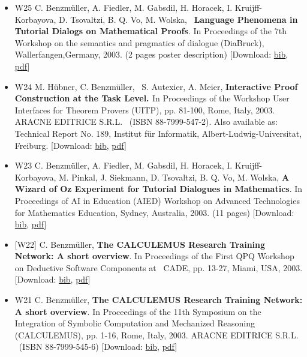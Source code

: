 \documentclass{article}
\newcommand{\tmtextbf}[1]{{\bfseries{#1}}}
\newenvironment{itemizedot}{\begin{itemize} \renewcommand{\labelitemi}{$\bullet$}\renewcommand{\labelitemii}{$\bullet$}\renewcommand{\labelitemiii}{$\bullet$}\renewcommand{\labelitemiv}{$\bullet$}}{\end{itemize}}
\begin{document}
\begin{itemizedot}
  \item [W25] {\small C. Benzm\"uller, A. Fiedler, M. Gabsdil, H. Horacek, I.
  Kruijff-Korbayova, D. Tsovaltzi, B. Q. Vo, M. Wolska, \ \tmtextbf{Language
  Phenomena in Tutorial Dialogs on Mathematical Proofs}. {\small In
  Proceedings of the 7th Workshop on the semantics and pragmatics of dialogue
  (DiaBruck)}{\large , {\small Wallerfangen},}{\small  Germany, 2003.} (2
  pages poster description) {\color{grey} [Download:
  \href{../papers/W25.bib}{bib}, \href{../papers/W25.pdf}{pdf}]}}
  
  \item [W24] {\small M. H\"ubner, C. Benzm\"uller, \ S. Autexier, A. Meier,
  }{\small \tmtextbf{Interactive Proof Construction at the Task Level.
  }}{\small In Proceedings of the Workshop User Interfaces for Theorem Provers
  (UITP), pp. 81-100, Rome, Italy, 2003. ARACNE EDITRICE S.R.L. \ (ISBN
  88-7999-547-2). Also available as: Technical Report No. 189, Institut f\"ur
  Informatik, Albert-Ludwig-Universitat, Freiburg.} {\color{grey} [Download:
  {\small \href{../papers/W24.bib}{bib}, \href{../papers/W24.pdf}{pdf}}]}
  
  \item [W23] C. Benzm\"uller, A. Fiedler, M. Gabsdil, H. Horacek, I.
  Kruijff-Korbayova, M. Pinkal, J. Siekmann, D. Tsovaltzi, B. Q. Vo, M.
  Wolska, {\small \tmtextbf{A Wizard of Oz Experiment for Tutorial Dialogues
  in Mathematics}}. {\small In Proceedings of AI in Education (AIED) Workshop
  on Advanced Technologies for Mathematics Education, Sydney, Australia,
  2003.} {\small (11 pages)} {\color{grey} [Download: {\small
  \href{../papers/W23.bib}{bib}, \href{../papers/W23.pdf}{pdf}}]}
  
  \item {\small [W22] C. Benzm\"uller, \tmtextbf{The CALCULEMUS Research
  Training Network: A short overview}. In Proceedings of the First QPQ
  Workshop on Deductive Software Components at \ CADE, pp. 13-27, Miami, USA,
  2003.} {\color{grey} [Download: {\small \href{../papers/W22.bib}{bib},
  \href{../papers/W22.pdf}{pdf}}]}
  
  \item [W21] C. Benzm\"uller, {\small \tmtextbf{The CALCULEMUS Research
  Training Network: A short overview}. In Proceedings of the 11th Symposium on
  the Integration of Symbolic Computation and Mechanized Reasoning
  (CALCULEMUS), pp. 1-16, Rome, Italy, 2003. ARACNE EDITRICE S.R.L. \ (ISBN
  88-7999-545-6)} {\color{grey} [Download: {\small
  \href{../papers/W21.bib}{bib}, \href{../papers/W21.pdf}{pdf}}]}
  

\end{itemizedot}
\end{document}

